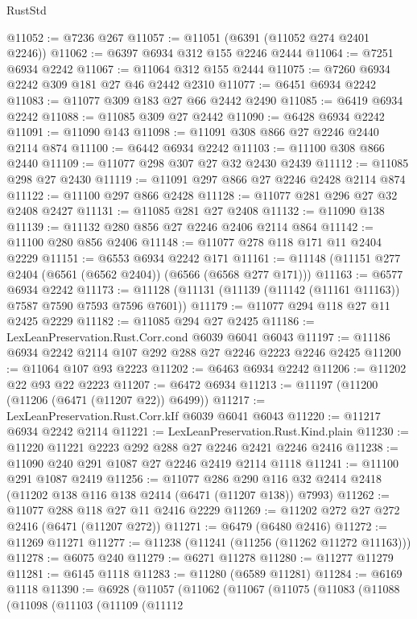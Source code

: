 \begin{lexlean}{RustStd}
\begin{coremodule}
{\begin{coremodule}
{{{{{{{{{{{{{{{{{{{{{{{{{{@11052 := @7236 @267
@11057 := @11051 (@6391 (@11052 @274 @2401 @2246))
@11062 := @6397 @6934 @312 @155 @2246 @2444
@11064 := @7251 @6934 @2242
@11067 := @11064 @312 @155 @2444
@11075 := @7260 @6934 @2242 @309 @181 @27 @46 @2442 @2310
@11077 := @6451 @6934 @2242
@11083 := @11077 @309 @183 @27 @66 @2442 @2490
@11085 := @6419 @6934 @2242
@11088 := @11085 @309 @27 @2442
@11090 := @6428 @6934 @2242
@11091 := @11090 @143
@11098 := @11091 @308 @866 @27 @2246 @2440 @2114 @874
@11100 := @6442 @6934 @2242
@11103 := @11100 @308 @866 @2440
@11109 := @11077 @298 @307 @27 @32 @2430 @2439
@11112 := @11085 @298 @27 @2430
@11119 := @11091 @297 @866 @27 @2246 @2428 @2114 @874
@11122 := @11100 @297 @866 @2428
@11128 := @11077 @281 @296 @27 @32 @2408 @2427
@11131 := @11085 @281 @27 @2408
@11132 := @11090 @138
@11139 := @11132 @280 @856 @27 @2246 @2406 @2114 @864
@11142 := @11100 @280 @856 @2406
@11148 := @11077 @278 @118 @171 @11 @2404 @2229
@11151 := @6553 @6934 @2242 @171
@11161 := @11148 (@11151 @277 @2404 (@6561 (@6562 @2404)) (@6566 (@6568 @277 @171)))
@11163 := @6577 @6934 @2242
@11173 := @11128 (@11131 (@11139 (@11142 (@11161 @11163)) @7587 @7590 @7593 @7596 @7601))
@11179 := @11077 @294 @118 @27 @11 @2425 @2229
@11182 := @11085 @294 @27 @2425
@11186 := LexLeanPreservation.Rust.Corr.cond @6039 @6041 @6043
@11197 := @11186 @6934 @2242 @2114 @107 @292 @288 @27 @2246 @2223 @2246 @2425
@11200 := @11064 @107 @93 @2223
@11202 := @6463 @6934 @2242
@11206 := @11202 @22 @93 @22 @2223
@11207 := @6472 @6934
@11213 := @11197 (@11200 (@11206 (@6471 (@11207 @22)) @6499))
@11217 := LexLeanPreservation.Rust.Corr.kIf @6039 @6041 @6043
@11220 := @11217 @6934 @2242 @2114
@11221 := LexLeanPreservation.Rust.Kind.plain
@11230 := @11220 @11221 @2223 @292 @288 @27 @2246 @2421 @2246 @2416
@11238 := @11090 @240 @291 @1087 @27 @2246 @2419 @2114 @1118
@11241 := @11100 @291 @1087 @2419
@11256 := @11077
    @286
    @290
    @116
    @32
    @2414
    @2418
    (@11202 @138 @116 @138 @2414 (@6471 (@11207 @138)) @7993)
@11262 := @11077 @288 @118 @27 @11 @2416 @2229
@11269 := @11202 @272 @27 @272 @2416 (@6471 (@11207 @272))
@11271 := @6479 (@6480 @2416)
@11272 := @11269 @11271
@11277 := @11238 (@11241 (@11256 (@11262 @11272 @11163)))
@11278 := @6075 @240
@11279 := @6271 @11278
@11280 := @11277 @11279
@11281 := @6145 @1118
@11283 := @11280 (@6589 @11281)
@11284 := @6169 @1118
@11390 := @6928
    (@11057
      (@11062
        (@11067
          (@11075
            (@11083
              (@11088
                (@11098
                  (@11103
                    (@11109
                      (@11112
}}}}}}}}}}}}}}}}}}}}}}}}}}
\end{coremodule}}
\end{coremodule}
\end{lexlean}
